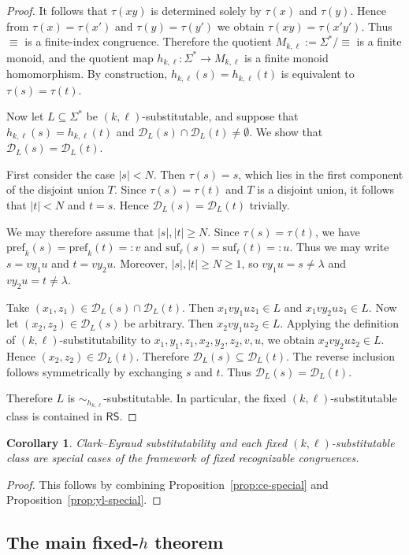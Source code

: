 \documentclass[11pt,a4paper]{article}
\newtheorem{corollary}[theorem]{Corollary}
\newcommand{\D}{\mathcal{D}}
\newcommand{\pref}{\mathrm{pref}}
\newcommand{\suf}{\mathrm{suf}}
\begin{document}
\begin{proof}
It follows that $\tau(xy)$ is determined solely by $\tau(x)$ and
$\tau(y)$. Hence from $\tau(x)=\tau(x')$ and $\tau(y)=\tau(y')$ we
obtain $\tau(xy)=\tau(x'y')$. Thus $\equiv$ is a finite-index
congruence. Therefore the quotient
$M_{k,\ell}:=\Sigma^*/{\equiv}$ is a finite monoid, and the quotient map
$h_{k,\ell}:\Sigma^*\to M_{k,\ell}$ is a finite monoid homomorphism.
By construction, $h_{k,\ell}(s)=h_{k,\ell}(t)$ is equivalent to
$\tau(s)=\tau(t)$.

Now let $L\subseteq\Sigma^*$ be $(k,\ell)$-substitutable, and suppose
that $h_{k,\ell}(s)=h_{k,\ell}(t)$ and
$\D_L(s)\cap\D_L(t)\neq\emptyset$. We show that
$\D_L(s)=\D_L(t)$.

First consider the case $|s|<N$. Then $\tau(s)=s$, which lies in the
first component of the disjoint union $T$. Since $\tau(s)=\tau(t)$ and
$T$ is a disjoint union, it follows that $|t|<N$ and $t=s$. Hence
$\D_L(s)=\D_L(t)$ trivially.

We may therefore assume that $|s|,|t|\ge N$. Since $\tau(s)=\tau(t)$,
we have $\pref_k(s)=\pref_k(t)=:v$ and $\suf_\ell(s)=\suf_\ell(t)=:u$.
Thus we may write $s=vy_1u$ and $t=vy_2u$. Moreover,
$|s|,|t|\ge N\ge1$, so $vy_1u=s\neq\lambda$ and $vy_2u=t\neq\lambda$.

Take $(x_1,z_1)\in\D_L(s)\cap\D_L(t)$. Then
$x_1vy_1uz_1\in L$ and $x_1vy_2uz_1\in L$. Now let
$(x_2,z_2)\in\D_L(s)$ be arbitrary. Then $x_2vy_1uz_2\in L$. Applying
the definition of $(k,\ell)$-substitutability to
$x_1,y_1,z_1,x_2,y_2,z_2,v,u$, we obtain $x_2vy_2uz_2\in L$. Hence
$(x_2,z_2)\in\D_L(t)$. Therefore $\D_L(s)\subseteq\D_L(t)$.
The reverse inclusion follows symmetrically by exchanging $s$ and $t$.
Thus $\D_L(s)=\D_L(t)$.

Therefore $L$ is $\sim_{h_{k,\ell}}$-substitutable. In particular, the
fixed $(k,\ell)$-substitutable class is contained in $\mathsf{RS}$.
\end{proof}

\begin{corollary}\label{cor:framework-special-cases}
Clark--Eyraud substitutability and each fixed
$(k,\ell)$-substitutable class are special cases of the framework of
fixed recognizable congruences.
\end{corollary}

\begin{proof}
This follows by combining Proposition~\ref{prop:ce-special} and
Proposition~\ref{prop:yl-special}.
\end{proof}

\subsection{The main fixed-\texorpdfstring{$h$}{h} theorem}
\label{subsec:main-fixed-h}
\end{document}
